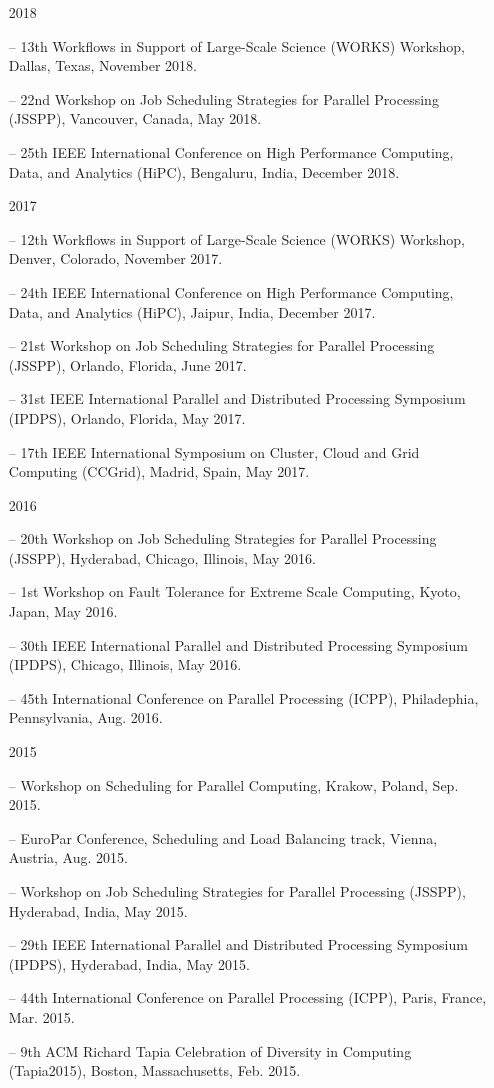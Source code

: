 \documentclass[times,11pt]{letter}
\begin{document}
\begin{itemize}
\item [2018]
\item[--]  13th Workflows in Support of Large-Scale Science (WORKS) Workshop, Dallas, Texas, November 2018.
\item[--]  22nd Workshop on Job Scheduling Strategies for Parallel Processing (JSSPP), Vancouver, Canada, May 2018.
\item[--]  25th IEEE International Conference on High Performance Computing, Data, and Analytics (HiPC), Bengaluru, India, December 2018.

\item [2017]
\item[--]  12th Workflows in Support of Large-Scale Science (WORKS) Workshop, Denver, Colorado, November 2017.
\item[--]  24th IEEE International Conference on High Performance Computing, Data, and Analytics (HiPC), Jaipur, India, December 2017.
\item[--]  21st Workshop on Job Scheduling Strategies for Parallel Processing (JSSPP), Orlando, Florida, June 2017.
\item[--]  31st IEEE International Parallel and Distributed Processing Symposium (IPDPS), Orlando, Florida, May 2017.
\item[--]  17th IEEE International Symposium on Cluster, Cloud and Grid Computing (CCGrid), Madrid, Spain, May 2017.

\item [2016]
\item[--]  20th Workshop on Job Scheduling Strategies for Parallel Processing (JSSPP), Hyderabad, Chicago, Illinois, May 2016.
\item[--]  1st Workshop on Fault Tolerance for Extreme Scale Computing, 
Kyoto, Japan, May 2016.
\item[--]  30th IEEE International Parallel and Distributed Processing Symposium (IPDPS), Chicago, Illinois, May 2016.
\item[--] 45th International Conference on Parallel Processing (ICPP),  Philadephia, Pennsylvania, Aug. 2016.

\item [2015]
\item[--]  Workshop on Scheduling for Parallel Computing, Krakow, Poland, Sep. 2015.
\item[--]  EuroPar Conference, Scheduling and Load Balancing track, Vienna, Austria, Aug. 2015.
\item[--]  Workshop on Job Scheduling Strategies for Parallel Processing (JSSPP), Hyderabad, India, May 2015.
\item[--]  29th IEEE International Parallel and Distributed Processing Symposium (IPDPS), Hyderabad, India, May 2015.
\item[--] 44th International Conference on Parallel Processing (ICPP),  Paris, France, Mar. 2015.
\item[--]  9th ACM Richard Tapia Celebration of Diversity in Computing (Tapia2015), Boston, Massachusetts, Feb. 2015.


\end{itemize}
\end{document}
